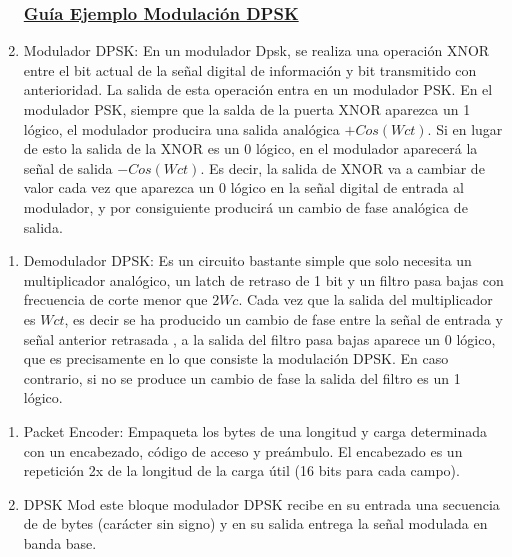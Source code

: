 	\begin{frame}
	\begin{enumerate}[1.]
	\frametitle{\underline{\textbf{Guía Ejemplo Modulación DPSK}}}
	\item{Modulador DPSK: En un modulador Dpsk, se realiza una operación XNOR entre el bit actual de la señal digital de información y bit transmitido con anterioridad. La salida de esta operación entra en un modulador PSK. En el modulador PSK, siempre que la salda de la puerta XNOR aparezca un 1 lógico, el modulador producira una salida analógica $+Cos(Wct)$. Si en lugar de esto la salida de la XNOR es un 0 lógico, en el modulador aparecerá la señal de salida $-Cos(Wct)$. Es decir, la salida de XNOR va a cambiar de valor cada vez que aparezca un 0 lógico en la señal digital de entrada al modulador, y por consiguiente producirá un cambio de fase analógica de salida.}\\

	\end{enumerate}
	\end{frame}	
	
	\begin{frame}
	\begin{enumerate}[1.]
	\frametitle{\underline{\textbf{Guía Ejemplo Modulación DPSK}}}
	\item{Demodulador DPSK: Es un circuito bastante simple que solo necesita un multiplicador analógico, un latch de retraso de 1 bit y un filtro pasa bajas con frecuencia de corte menor que $2Wc$. Cada vez que la salida del multiplicador es $Wct$, es decir se ha producido un cambio de fase entre la señal de entrada y señal anterior retrasada , a la salida del filtro pasa bajas aparece un 0 lógico, que es precisamente en lo que consiste la modulación DPSK. En caso contrario, si no se produce un cambio de fase la salida del filtro es un 1 lógico.}\\

	\end{enumerate}
	\end{frame}
	
	\begin{frame}
	\begin{enumerate}[1.]
	\frametitle{\underline{\textbf{Codificación y Modulación DPSK}}}
	\item{Packet Encoder: Empaqueta los bytes de una longitud y carga determinada con un encabezado, código de acceso y preámbulo.  El encabezado es un repetición 2x de la longitud de la carga útil (16 bits para cada campo).}\\
	\item{DPSK Mod este bloque modulador DPSK recibe en su entrada una secuencia de de bytes  (carácter sin signo) y en su salida entrega la señal modulada en banda base.}\\
	\end{enumerate}
	\end{frame}

